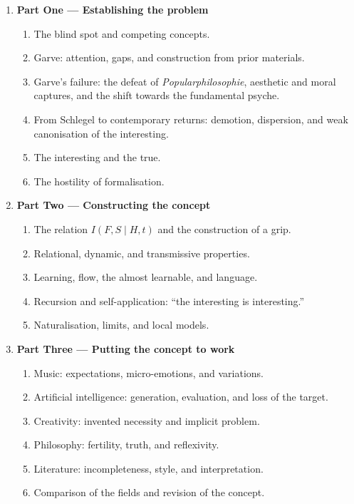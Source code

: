 \documentclass[11pt,a4paper]{article}
\begin{document}
\begin{enumerate}
  \item \textbf{Part One --- Establishing the problem}
    \begin{enumerate}
      \item The blind spot and competing concepts.
      \item Garve: attention, gaps, and construction from prior materials.
      \item Garve's failure: the defeat of \emph{Popularphilosophie}, aesthetic
            and moral captures, and the shift towards the fundamental psyche.
      \item From Schlegel to contemporary returns: demotion, dispersion, and
            weak canonisation of the interesting.
      \item The interesting and the true.
      \item The hostility of formalisation.
    \end{enumerate}
  \item \textbf{Part Two --- Constructing the concept}
    \begin{enumerate}
      \item The relation \(I(F,S\mid H,t)\) and the construction of a grip.
      \item Relational, dynamic, and transmissive properties.
      \item Learning, flow, the almost learnable, and language.
      \item Recursion and self-application: ``the interesting is interesting.''
      \item Naturalisation, limits, and local models.
    \end{enumerate}
  \item \textbf{Part Three --- Putting the concept to work}
    \begin{enumerate}
      \item Music: expectations, micro-emotions, and variations.
      \item Artificial intelligence: generation, evaluation, and loss of the
            target.
      \item Creativity: invented necessity and implicit problem.
      \item Philosophy: fertility, truth, and reflexivity.
      \item Literature: incompleteness, style, and interpretation.
      \item Comparison of the fields and revision of the concept.
    \end{enumerate}
\end{enumerate}
\end{document}
